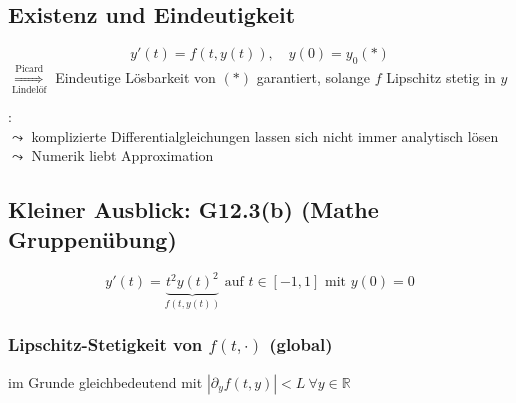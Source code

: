 \documentclass[
    accentcolor=pink,
    boxarc,
    dark_mode,
    logofile=enmpty
]{rubos-tuda-template}
\begin{document}
    \subsection*{Existenz und Eindeutigkeit}
    \[y'(t)=f(t,y(t)),\quad y(0)=y_0 (*)\]
    $\overset{\text{Picard}}{\underset{\text{Lindelöf}}{\Rightarrow}}$ Eindeutige Lösbarkeit von $(*)$ garantiert, solange $f$ Lipschitz stetig in $y$

    :\\
    $\leadsto$ komplizierte Differentialgleichungen lassen sich nicht immer analytisch lösen\\
    $\leadsto$ Numerik liebt Approximation

    \subsection*{Kleiner Ausblick: G12.3(b) (Mathe Gruppenübung)}
    \[y'(t)=\underbrace{t^2y(t)^2}_{f(t,y(t))}\text{ auf }t\in[-1,1]\text{ mit }y(0)=0\]

    \subsubsection*{Lipschitz-Stetigkeit von $f(t,\cdot)$ (global)}
    im Grunde gleichbedeutend mit $|\partial_yf(t,y)| < L\ \forall y\in\mathbb{R}$
\end{document}
